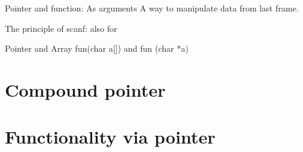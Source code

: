 \documentclass{beamer}
\begin{document}
\begin{frame}{Pointer and function: As arguments}
  A way to manipulate data from last frame.

  The principle of scanf: %
  also for 

\end{frame}

\begin{frame}{Pointer and Array}
fun(char a[]) and fun (char *a)
\end{frame}




\section{Compound pointer}

\section{Functionality via pointer}
\end{document}
